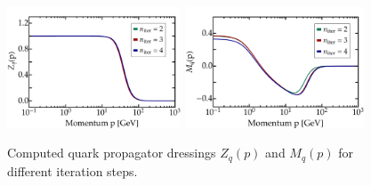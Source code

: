  \begin{figure}[t] 
\hfill
	\centering
	\includegraphics[width = 0.46\textwidth, trim= 4em 0 0 0]{figs/plots/ZqPlot}
\hfill
	\includegraphics[width = 0.475\textwidth, trim= 4em 0 0 0]{figs/plots/MqPlot}
\hfill
	\caption[Computed quark propagator dressings $Z_q(p)$ and $M_q(p)$.]{Computed quark propagator dressings $Z_q(p)$ and $M_q(p)$ for different iteration steps.}
\label{fig:computed_dressings}
\end{figure}

